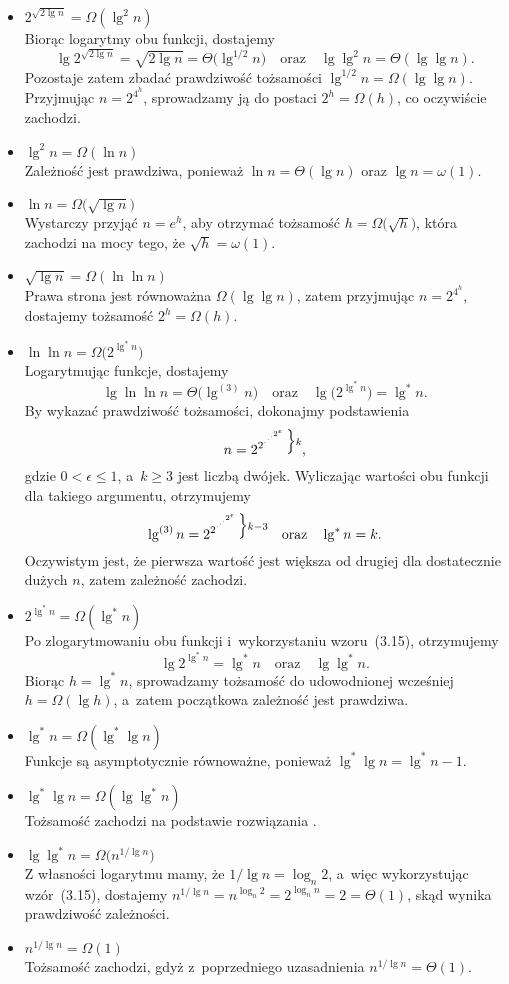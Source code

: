 \begin{itemize}
\item $2^{\sqrt{2\lg n}}=\Omega(\lg^2 n)$ \\
	Biorąc logarytmy obu funkcji, dostajemy
	\[
		\lg2^{\sqrt{2\lg n}} = \sqrt{2\lg n} = \Theta\bigl(\lg^{1/2}n\bigr) \quad\text{oraz}\quad \lg\lg^2n = \Theta(\lg\lg n).
	\]
	Pozostaje zatem zbadać prawdziwość tożsamości $\lg^{1/2}n=\Omega(\lg\lg n)$. Przyjmując $n=2^{4^h}$, sprowadzamy ją do postaci $2^h=\Omega(h)$, co oczywiście zachodzi.
\item $\lg^2n=\Omega(\ln n)$ \\
	Zależność jest prawdziwa, ponieważ $\ln n=\Theta(\lg n)$ oraz $\lg n=\omega(1)$.
\item $\ln n=\Omega\bigl(\!\sqrt{\lg n}\bigr)$ \\
	Wystarczy przyjąć $n=e^h$, aby otrzymać tożsamość $h=\Omega\bigl(\!\sqrt{h}\bigr)$, która zachodzi na mocy tego, że $\sqrt{h}=\omega(1)$.
\item $\sqrt{\lg n}=\Omega(\ln\ln n)$ \\
	Prawa strona jest równoważna $\Omega(\lg\lg n)$, zatem przyjmując $n=2^{4^h}$, dostajemy tożsamość $2^h=\Omega(h)$.
\item $\ln\ln n=\Omega\bigl(2^{\lg^*n}\bigr)$ \\
	Logarytmując funkcje, dostajemy
	\[
		\lg\ln\ln n = \Theta\bigl(\lg^{(3)}n\bigr) \quad\text{oraz}\quad \lg\bigl(2^{\lg^*n}\bigr) = \lg^*n.
	\]
	By wykazać prawdziwość tożsamości, dokonajmy podstawienia
	\[
		n = 2^{2^{\cdot^{\cdot^{\cdot^{2^\epsilon}}}}}\vbox{\hbox{$\Big\}\scriptstyle k$}\kern0pt},
	\]
	gdzie $0<\epsilon\le1$, a~$k\ge3$ jest liczbą dwójek. Wyliczając wartości obu funkcji dla takiego argumentu, otrzymujemy
	\[
		\lg^{(3)}n = 2^{2^{\cdot^{\cdot^{\cdot^{2^\epsilon}}}}}\vbox{\hbox{$\Big\}\scriptstyle k-3$}\kern0pt} \quad\text{oraz}\quad \lg^*n=k.
	\]
	Oczywistym jest, że pierwsza wartość jest większa od drugiej dla dostatecznie dużych $n$, zatem zależność zachodzi.
\item $2^{\lg^*n}=\Omega(\lg^*n)$ \\
	Po zlogarytmowaniu obu funkcji i~wykorzystaniu wzoru~(3.15), otrzymujemy
	\[
		\lg2^{\lg^*n} = \lg^*n \quad\text{oraz}\quad \lg\lg^*n.
	\]
	Biorąc $h=\lg^*n$, sprowadzamy tożsamość do udowodnionej wcześniej $h=\Omega(\lg h)$, a~zatem początkowa zależność jest prawdziwa.
\item $\lg^*n=\Omega(\lg^*\lg n)$ \\
	Funkcje są asymptotycznie równoważne, ponieważ $\lg^*\lg n=\lg^*n-1$.
\item $\lg^*\lg n=\Omega(\lg\lg^*n)$ \\
	Tożsamość zachodzi na podstawie rozwiązania .
\item $\lg\lg^*n=\Omega\bigl(n^{1/\!\lg n}\bigr)$ \\
	Z własności logarytmu mamy, że $1/\!\lg n=\log_n2$, a~więc wykorzystując wzór~(3.15), dostajemy $n^{1/\!\lg n}=n^{\log_n2}=2^{\log_nn}=2=\Theta(1)$, skąd wynika prawdziwość zależności.
\item $n^{1/\!\lg n}=\Omega(1)$ \\
	Tożsamość zachodzi, gdyż z~poprzedniego uzasadnienia $n^{1/\!\lg n}=\Theta(1)$.
\end{itemize}

